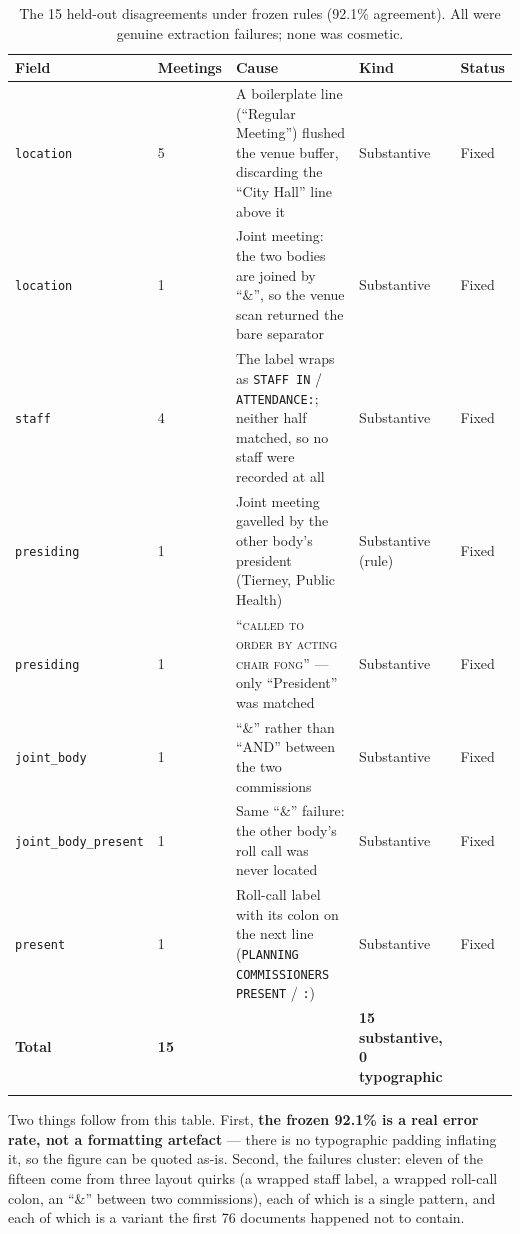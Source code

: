 \documentclass[11pt]{article}
\begin{document}
\begin{longtable}{p{}p{}p{}p{}p{}}
\toprule
Field & Meetings & Cause & Kind & Status \\
\midrule
\endhead
\texttt{location} & 5 & A boilerplate line (``Regular Meeting'') flushed the venue buffer,
discarding the ``City Hall'' line above it & Substantive & Fixed \\
\texttt{location} & 1 & Joint meeting: the two bodies are joined by ``\&'', so the venue
scan returned the bare separator & Substantive & Fixed \\
\texttt{staff} & 4 & The label wraps as \texttt{STAFF IN} / \texttt{ATTENDANCE:}; neither
half matched, so no staff were recorded at all & Substantive & Fixed \\
\texttt{presiding} & 1 & Joint meeting gavelled by the other body's president (Tierney,
Public Health) & Substantive (rule) & Fixed \\
\texttt{presiding} & 1 & ``\textsc{called to order by acting chair fong}'' --- only
``President'' was matched & Substantive & Fixed \\
\texttt{joint\_body} & 1 & ``\&'' rather than ``AND'' between the two commissions & Substantive & Fixed \\
\texttt{joint\_body\_present} & 1 & Same ``\&'' failure: the other body's roll call was never located & Substantive & Fixed \\
\texttt{present} & 1 & Roll-call label with its colon on the next line
(\texttt{PLANNING COMMISSIONERS PRESENT} / \texttt{:}) & Substantive & Fixed \\
\midrule
\textbf{Total} & \textbf{15} & & \textbf{15 substantive, 0 typographic} & \\
\bottomrule
\caption{The 15 held-out disagreements under frozen rules (92.1\% agreement). All were
genuine extraction failures; none was cosmetic.}
\end{longtable}

\noindent
Two things follow from this table. First, \textbf{the frozen 92.1\% is a real error rate,
not a formatting artefact} --- there is no typographic padding inflating it, so the figure
can be quoted as-is. Second, the failures cluster: eleven of the fifteen come from three
layout quirks (a wrapped staff label, a wrapped roll-call colon, an ``\&'' between two
commissions), each of which is a single pattern, and each of which is a variant the first
76 documents happened not to contain.
\end{document}
